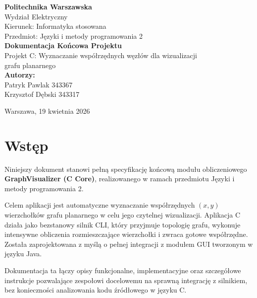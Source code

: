 \documentclass[12pt,a4paper]{article}
\begin{document}
\begin{titlepage}
    \begin{center}
        \vspace*{1cm}
        
        {\LARGE \textbf{Politechnika Warszawska}} \\[0.2cm]
        {\Large Wydział Elektryczny} \\[2cm]
        
        {\large Kierunek: Informatyka stosowana} \\[0.1cm]
        {\large Przedmiot: Języki i metody programowania 2} \\[3.5cm]
        
        {\Huge \textbf{Dokumentacja Końcowa Projektu}} \\[1cm]
        {\Large Projekt C: Wyznaczanie współrzędnych węzłów dla wizualizacji\\ grafu planarnego} \\[3.5cm] 
        
        {\large \textbf{Autorzy:}} \\[0.2cm]
        {\large Patryk Pawlak 343367} \\[0.1cm]
        {\large Krzysztof Dębski 343317}
        
        \vfill
        
        {\large Warszawa, 19 kwietnia 2026}
        \vspace*{0.5cm}
    \end{center}
\end{titlepage}

\tableofcontents
\newpage

\section{Wstęp}
Niniejszy dokument stanowi pełną specyfikację końcową modułu obliczeniowego \textbf{GraphVisualizer (C Core)}, realizowanego w ramach przedmiotu Języki i metody programowania 2. 

Celem aplikacji jest automatyczne wyznaczanie współrzędnych $(x, y)$ wierzchołków grafu planarnego w celu jego czytelnej wizualizacji. Aplikacja C działa jako bezstanowy silnik CLI, który przyjmuje topologię grafu, wykonuje intensywne obliczenia rozmieszczające wierzchołki i zwraca gotowe współrzędne. Została zaprojektowana z myślą o pełnej integracji z modułem GUI tworzonym w języku Java.

Dokumentacja ta łączy opisy funkcjonalne, implementacyjne oraz szczegółowe instrukcje pozwalające zespołowi docelowemu na sprawną integrację z silnikiem, bez konieczności analizowania kodu źródłowego w języku C.
\end{document}
